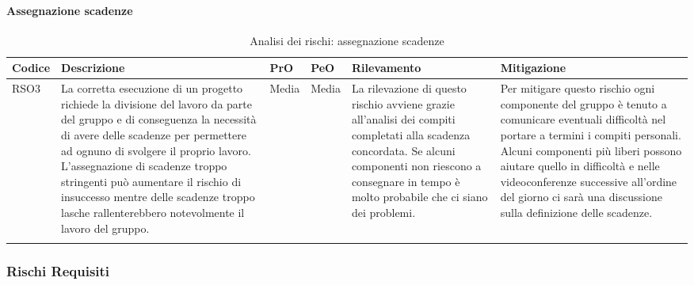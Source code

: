 \paragraph{Assegnazione scadenze}
		\begin{center}

	\begin{longtable}{p{1cm}|p{4cm}|p{0.7cm}|p{0.7cm}|p{3cm}|p{4cm}}
		\arrayrulecolor{white}
		\hline
		\rowcolor{blue!20}
		\textbf{Codice} & 
		\textbf{Descrizione} &
		\textbf{PrO}  &
		\textbf{PeO}  &				        
		\textbf{Rilevamento} &
		\textbf{Mitigazione} \\
		\hline	
		RSO3 & La corretta esecuzione di un progetto richiede la divisione del lavoro da parte del gruppo e di conseguenza la necessità di avere delle scadenze per permettere ad ognuno di svolgere il proprio lavoro. L'assegnazione di scadenze troppo stringenti può aumentare il rischio di insuccesso mentre delle scadenze troppo lasche rallenterebbero notevolmente il lavoro del gruppo. & Media & Media & La rilevazione di questo rischio avviene grazie all'analisi dei compiti completati alla scadenza concordata. Se alcuni componenti non riescono a consegnare in tempo è molto probabile che ci siano dei problemi. & Per mitigare questo rischio ogni componente del gruppo è tenuto a comunicare eventuali difficoltà nel portare a termini i compiti personali. Alcuni componenti più liberi possono aiutare quello in difficoltà e nelle videoconferenze successive all'ordine del giorno ci sarà una discussione sulla definizione delle scadenze. \\
		
		\rowcolor{white}
		\caption{Analisi dei rischi: assegnazione scadenze}
	\end{longtable}
\end{center}
\subsubsection{Rischi Requisiti}
